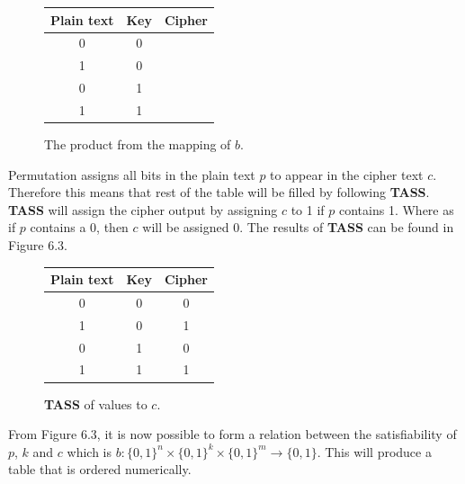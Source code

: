 \documentclass[11pt,a4paper, notitlepage]{report}
\begin{document}
\begin{figure}[H]
\centering
\label{tab:relationstage1}
\begin{tabular}{|c|c|c|}
\hline
Plain text & Key & Cipher\\ \hline
0 & 0 & {}\\ \hline
1 & 0 & {}\\ \hline
0 & 1 & {}\\ \hline
1 & 1 & {}\\ \hline
\end{tabular}
\caption{The product from the mapping of $b$. }
\end{figure}
\noindent Permutation assigns all bits in the plain text $p$ to appear in the cipher text $c$. Therefore this means that rest of the table will be filled by following \textbf{TASS}. \textbf{TASS} will assign the cipher output by assigning $c$ to 1 if $p$ contains 1. Where as if $p$ contains a 0, then $c$ will be assigned 0. The results of \textbf{TASS} can be found in Figure 6.3.  

\begin{figure}[H]
\centering
\label{tab:relationsage2}
\begin{tabular}{|c|c|c|}
\hline
Plain text & Key & Cipher\\ \hline
0 & 0 & 0\\ \hline
1 & 0 & 1\\ \hline
0 & 1 & 0\\ \hline
1 & 1 & 1\\ \hline
\end{tabular}
\caption{\textbf{TASS} of values to $c$.}
\end{figure}
\noindent From Figure 6.3, it is now possible to form a relation between the satisfiability of $p$, $k$ and $c$ which is
$b:  \{0,1\}^n \times \{0,1\}^k \times \{0,1\}^m \rightarrow \{0,1\}$. This will produce a table that is ordered numerically. 
\end{document}
